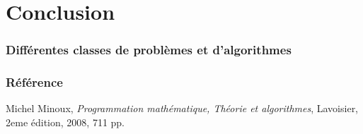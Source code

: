\documentclass{beamer}
\begin{document}
\section{Conclusion}

\begin{frame}
  \frametitle{Différentes classes de problèmes et d'algorithmes}

  
\end{frame}

\begin{frame}
  \frametitle{Référence}

\begin{thebibliography}{alpha}
Michel Minoux, \emph{Programmation mathématique, Théorie et algorithmes}, Lavoisier, 2eme édition, 2008, 711 pp.
\end{thebibliography}

\end{frame}
\end{document}
